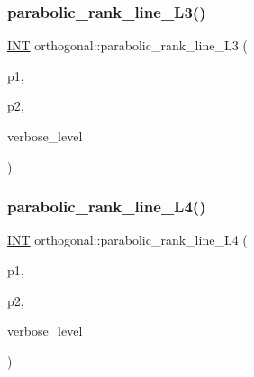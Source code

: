 \subsubsection{\texorpdfstring{parabolic\+\_\+rank\+\_\+line\+\_\+\+L3()}{parabolic\_rank\_line\_L3()}}
{\footnotesize\ttfamily \mbox{\hyperlink{galois_8h_a09fddde158a3a20bd2dcadb609de11dc}{I\+NT}} orthogonal\+::parabolic\+\_\+rank\+\_\+line\+\_\+\+L3 (\begin{DoxyParamCaption}\item[{\mbox{\hyperlink{galois_8h_a09fddde158a3a20bd2dcadb609de11dc}{I\+NT}}}]{p1,  }\item[{\mbox{\hyperlink{galois_8h_a09fddde158a3a20bd2dcadb609de11dc}{I\+NT}}}]{p2,  }\item[{\mbox{\hyperlink{galois_8h_a09fddde158a3a20bd2dcadb609de11dc}{I\+NT}}}]{verbose\+\_\+level }\end{DoxyParamCaption})}

\mbox{\label{classorthogonal_a9e693d30c0ade825f389feec38ea83b2}} 
\subsubsection{\texorpdfstring{parabolic\+\_\+rank\+\_\+line\+\_\+\+L4()}{parabolic\_rank\_line\_L4()}}
{\footnotesize\ttfamily \mbox{\hyperlink{galois_8h_a09fddde158a3a20bd2dcadb609de11dc}{I\+NT}} orthogonal\+::parabolic\+\_\+rank\+\_\+line\+\_\+\+L4 (\begin{DoxyParamCaption}\item[{\mbox{\hyperlink{galois_8h_a09fddde158a3a20bd2dcadb609de11dc}{I\+NT}}}]{p1,  }\item[{\mbox{\hyperlink{galois_8h_a09fddde158a3a20bd2dcadb609de11dc}{I\+NT}}}]{p2,  }\item[{\mbox{\hyperlink{galois_8h_a09fddde158a3a20bd2dcadb609de11dc}{I\+NT}}}]{verbose\+\_\+level }\end{DoxyParamCaption})}

\mbox{\label{classorthogonal_ab9ff5dd42f31a297d03c559a4934a950}} 
